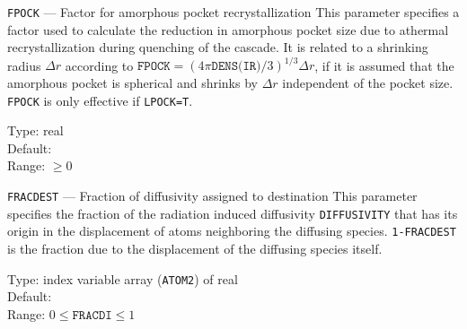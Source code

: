 \begin{keydescription}{\texttt{FPOCK} --- Factor for amorphous pocket 
    recrystallization}
%
  This parameter specifies a factor used to calculate the reduction in
  amorphous pocket size due to athermal recrystallization during quenching of 
  the cascade.  It is related to a shrinking radius $\Delta r$ according to 
  $\texttt{FPOCK} = (4 \pi \texttt{DENS(IR)} / 3) ^ {1/3} \Delta r$, if it is 
  assumed that the amorphous pocket is spherical and shrinks by $\Delta r$
  independent of the pocket size.  \texttt{FPOCK} is only effective if
  \texttt{LPOCK=T}.

  \begin{keytab} 
     Type:    \> real \\ 
     Default:  \\ 
     Range:   \> $\ge 0$
  \end{keytab}
\end{keydescription}

\begin{keydescription}{\texttt{FRACDEST} --- Fraction of diffusivity assigned to destination}
%
  This parameter specifies the fraction of the radiation induced diffusivity
  \texttt{DIFFUSIVITY} that has its origin in the displacement of atoms
  neighboring the diffusing species. \texttt{1-FRACDEST} is the fraction
  due to the displacement of the diffusing species itself. 
  \begin{keytab}
    Type:    \> index variable array (\texttt{ATOM2}) of real \\
    Default:  \\
    Range:   \> $0 \le \texttt{FRACDI} \le 1$
  \end{keytab}
\end{keydescription}

